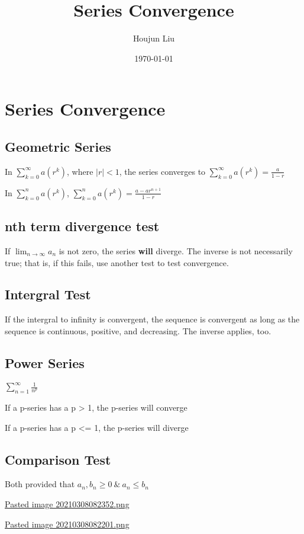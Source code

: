\documentclass[letterpaper]{article}
\author{Houjun Liu}
\date{\today}
\title{Series Convergence}
\renewcommand{\tableofcontents}{}
\begin{document}
\tableofcontents



\section{Series Convergence}
\label{sec:org818f316}
\subsection{Geometric Series}
\label{sec:orgcca4916}
In \(\sum_{k=0}^\infty a(r^k)\), where \(|r|<1\), the series converges
to \(\sum_{k=0}^\infty a(r^k) = \frac{a}{1-r}\)

In \(\sum_{k=0}^n a(r^k)\),
\(\sum_{k=0}^n a(r^k) = \frac{a-ar^{n+1}}{1-r}\)

\subsection{nth term divergence test}
\label{sec:org20e2b3a}
If \(\lim_{n \to \infty} a_n\) is not zero, the series \textbf{will} diverge.
The inverse is not necessarily true; that is, if this fails, use another
test to test convergence.

\subsection{Intergral Test}
\label{sec:orgc4a7036}
If the intergral to infinity is convergent, the sequence is convergent
as long as the sequence is continuous, positive, and decreasing. The
inverse applies, too.

\subsection{Power Series}
\label{sec:orga0005a9}
\(\sum^{\infty}_{n=1} \frac{1}{n^p}\)

If a p-series has a p > 1, the p-series will converge

If a p-series has a p <= 1, the p-series will diverge

\subsection{Comparison Test}
\label{sec:orge73da4c}
Both provided that \(a_n,b_n \geq 0\ \&\ a_n \leq b_n\)

\href{Pasted image 20210308082352.png.org}{Pasted image
20210308082352.png}

\href{Pasted image 20210308082201.png.org}{Pasted image
20210308082201.png}
\end{document}
